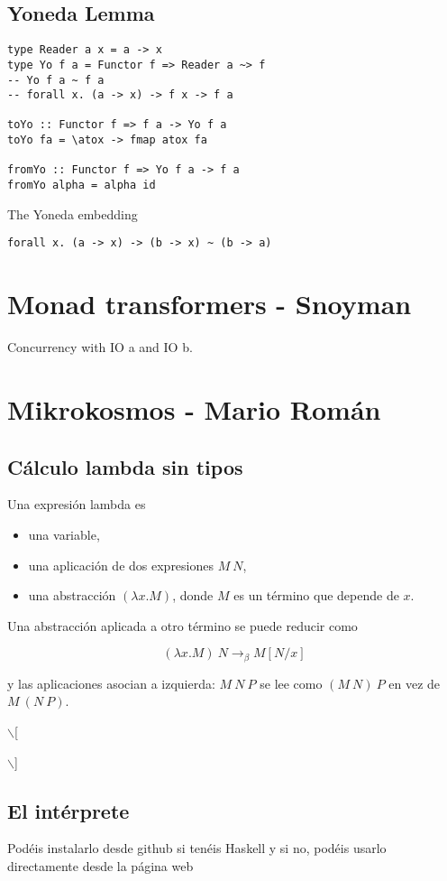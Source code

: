\documentclass[11pt]{article}
\begin{document}
\subsection*{Yoneda Lemma}
\label{sec-12-1}
\begin{verbatim}
type Reader a x = a -> x
type Yo f a = Functor f => Reader a ~> f
-- Yo f a ~ f a
-- forall x. (a -> x) -> f x -> f a

toYo :: Functor f => f a -> Yo f a
toYo fa = \atox -> fmap atox fa

fromYo :: Functor f => Yo f a -> f a
fromYo alpha = alpha id
\end{verbatim}

The Yoneda embedding

\begin{verbatim}
forall x. (a -> x) -> (b -> x) ~ (b -> a)
\end{verbatim}

\section*{Monad transformers - Snoyman}
\label{sec-13}
Concurrency with IO a and IO b.

\section*{Mikrokosmos - Mario Román}
\label{sec-14}
\subsection*{Cálculo lambda sin tipos}
\label{sec-14-1}
Una expresión lambda es

\begin{itemize}
\item una variable,
\item una aplicación de dos expresiones $M\ N$,
\item una abstracción $(\lambda x.M)$, donde $M$ es un término que depende de $x$.
\end{itemize}

Una abstracción aplicada a otro término se puede reducir como

\[
(\lambda x.M)\ N \longrightarrow_{\beta} M[N/x]
\]

y las aplicaciones asocian a izquierda: $M\ N\ P$ se lee como $(M\ N)\ P$
en vez de $M\ (N\ P)$.

$\backslash$[

$\backslash$]

\subsection*{El intérprete}
\label{sec-14-2}
Podéis instalarlo desde github si tenéis Haskell y si no, podéis usarlo
directamente desde la página web
\end{document}
